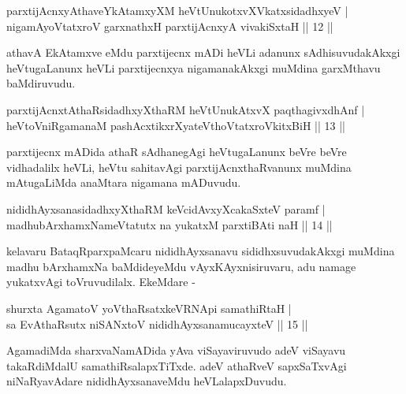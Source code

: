 
\begin{shl}
parxtijAcnxyAthaveYkAtamxyXM heVtUnukotxvXVkatxsidadhxyeV |\\
nigamAyoVtatxroV garxnathxH parxtijAcnxyA vivakiSxtaH \hfill || 12 ||
\end{shl}

\begin{artha}
athavA EkAtamxve eMdu parxtijecnx mADi heVLi adanunx sAdhisuvudakAkxgi heVtugaLanunx heVLi parxtijecnxya nigamanakAkxgi muMdina garxMthavu baMdiruvudu.
\end{artha}


\begin{shl}
parxtijAcnxtAthaRsidadhxyXthaRM heVtUnukAtxvX paqthagivxdhAnf |\\
heVtoVniRgamanaM pashAcxtikxrXyateV\s thoVtatxroVkitxBiH \hfill || 13 ||
\end{shl}

\begin{artha}
parxtijecnx mADida athaR sAdhanegAgi heVtugaLanunx beVre beVre vidhadalilx heVLi, heVtu sahitavAgi parxtijAcnxthaRvanunx muMdina mAtugaLiMda anaMtara nigamana mADuvudu.
\end{artha}

\begin{shl}
nididhAyxsanasidadhxyXthaRM keVcidAvxyXcakaSxteV paramf |\\
madhubArxhamxNameVtatutx na yukatxM parxtiBAti naH \hfill || 14 ||
\end{shl}

\begin{artha}
kelavaru BataqRparxpaMcaru nididhAyxsanavu sididhxsuvudakAkxgi muMdina
madhu bArxhamxNa baMdideyeMdu vAyxKAyxnisiruvaru, adu namage
yukatxvAgi toVruvudilalx. EkeMdare -
\end{artha}

\begin{shl}
shurxta AgamatoV yoV\s thaRsatxkeVRNApi samathiRtaH |\\
sa EvAthaRsutx niSANxtoV nididhAyxsanamucayxteV \hfill || 15 ||
\end{shl}

\begin{artha}
AgamadiMda sharxvaNamADida yAva viSayaviruvudo adeV viSayavu takaRdiMdalU samathiRsalapxTiTxde. adeV athaRveV sapxSaTxvAgi niNaRyavAdare nididhAyxsanaveMdu heVLalapxDuvudu.
\end{artha}

